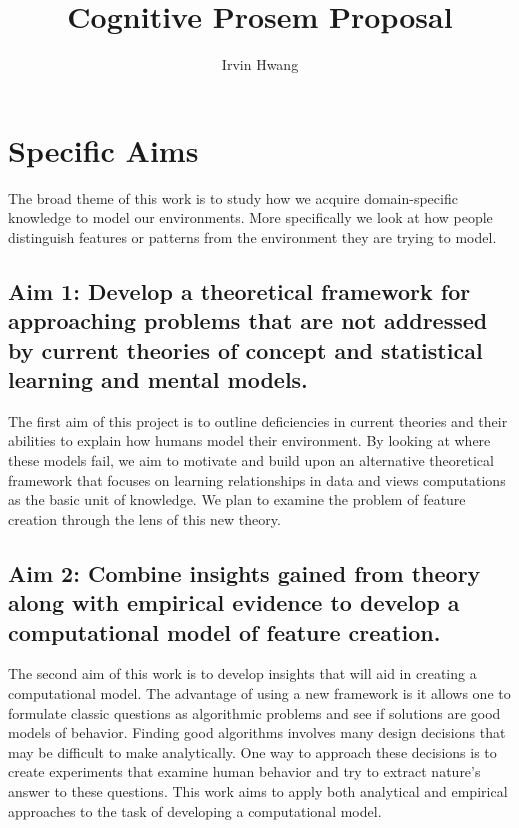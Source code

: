 \documentclass[doc]{apa}%
\title{Cognitive Prosem Proposal}
\author{Irvin Hwang}
\affiliation{Department of Psychology \\ Princeton University}
\begin{document}
\maketitle   
\section{Specific Aims}
The broad theme of this work is to study how we acquire
domain-specific knowledge to model our environments.  More
specifically we look at how people distinguish features or patterns from the environment they are trying to model.

\subsection{Aim 1: Develop a theoretical framework for approaching problems that are not addressed by current theories of concept and statistical learning and mental models.}
The first aim of this project is to outline deficiencies in current theories and their abilities to explain how humans model their environment.  By looking at where these models fail, we aim to motivate and build upon an alternative theoretical framework that focuses on learning relationships in data and views computations as the basic unit of knowledge.  We plan to examine the problem of feature creation through the lens of this new theory.

\subsection{Aim 2: Combine insights gained from theory along with empirical evidence to develop a computational model of feature creation.}
The second aim of this work is to develop insights that will aid in
creating a computational model. The advantage of using a new framework is it
allows one to formulate classic questions as algorithmic problems and see if solutions are good models of behavior.  Finding good algorithms involves many design decisions that may be difficult to make analytically.  One way to approach these decisions is to create experiments that examine human behavior and try to extract nature's answer to these questions.  This work aims to apply both analytical and empirical approaches to the task of developing a computational model.
\end{document}
